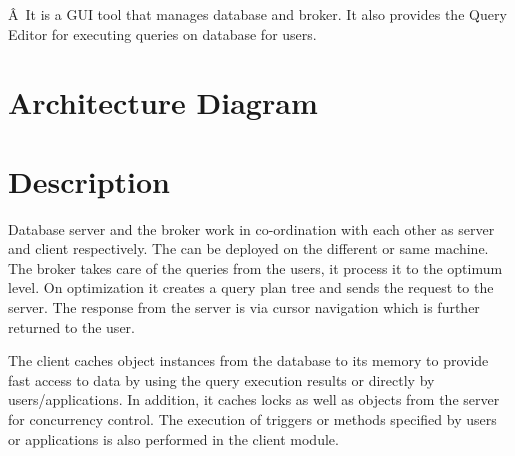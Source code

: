 \documentclass[9pt,twocolumn,twoside]{../../styles/osajnl}
\begin{document}
Â It is a GUI tool that manages database and broker. It also provides
the Query Editor for executing queries on database for users.

\section{Architecture Diagram}

\begin{figure}[htbp]
\centering
{}
\caption{\cite{www-cubrid.org}}
\label{Reference:false-color}
\end{figure}

\newpage

\section{Description}

Database server and the broker work in co-ordination with each other
as server and client respectively. The can be deployed on the
different or same machine. The broker takes care of the queries from
the users, it process it to the optimum level. On optimization it
creates a query plan tree and sends the request to the server. The
response from the server is via cursor navigation which is further
returned to the user.

The client caches object instances from the
database to its memory to provide fast access to data by using the
query execution results or directly by users/applications. In
addition, it caches locks as well as objects from the server for
concurrency control. The execution of triggers or methods specified by
users or applications is also performed in the client module.
\end{document}
